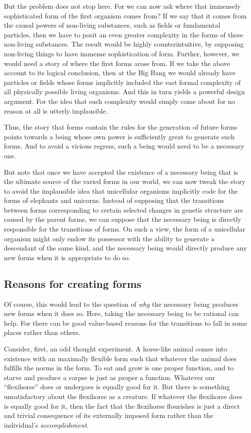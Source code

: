But the problem does not stop here. For we can now ask where that immensely sophisticated form of the first organism comes
from? If we say that it comes from the causal powers of non-living substances, such as fields or fundamental particles,
then we have to posit an even greater complexity in the forms of these non-living substances. The result would be highly
counterintuitive, by supposing non-living things to have immense sophistication of form. Further, however, we would need a 
story of where the first forms arose from. If we take the above account to its logical conclusion, then at the Big Bang
we would already have particles or fields whose forms implicitly included the vast formal complexity of all physically
possible living organisms. And this in turn yields a powerful design argument. For the idea that such complexity would
simply come about for no reason at all is utterly implausible. 

Thus, the story that forms contain the rules for the generation of future forms points towards a being whose own power is
sufficiently great to generate such forms. And to avoid a vicious regress, such a being would need to be a necessary one.

But note that once we have accepted the existence of a necessary being that is the ultimate source of the varied forms 
in our world, we can now tweak the story to avoid the implausible idea that unicellular organisms implicitly code for
the forms of elephants and unicorns. Instead of supposing that the transitions between forms corresponding to certain
selected changes in genetic structure are caused by the parent forms, we can suppose that the necessary being is directly
responsible for the transitions of forms. On such a view, the form of a unicellular organism might only endow its
possessor with the ability to generate a descendant of the same kind, and the necessary being would directly produce
any new forms when it is appropriate to do so.

\subsection{Reasons for creating forms}
Of course, this would lead to the question of \textit{why} the necessary being produces new forms when it does so.
Here, taking the necessary being to be rational can help. For there can be good value-based reasons for the transitions
to fall in some places rather than others. 

Consider, first, an odd thought experiment. A horse-like animal comes into existence with an maximally flexible form such that
whatever the animal does fulfills the norms in the form. To eat and grow is one proper function, and to starve and produce
a corpse is just as proper a function. Whatever our ``flexihorse'' does or undergoes is equally good for it. But there is something unsatisfactory about the flexihorse as a creature. If whatever the flexihorse does is equally good for it, then the fact 
that the flexihorse flourishes is just a direct and trivial consequence of its externally imposed form rather than the individual's 
\textit{accomplishment}. 

